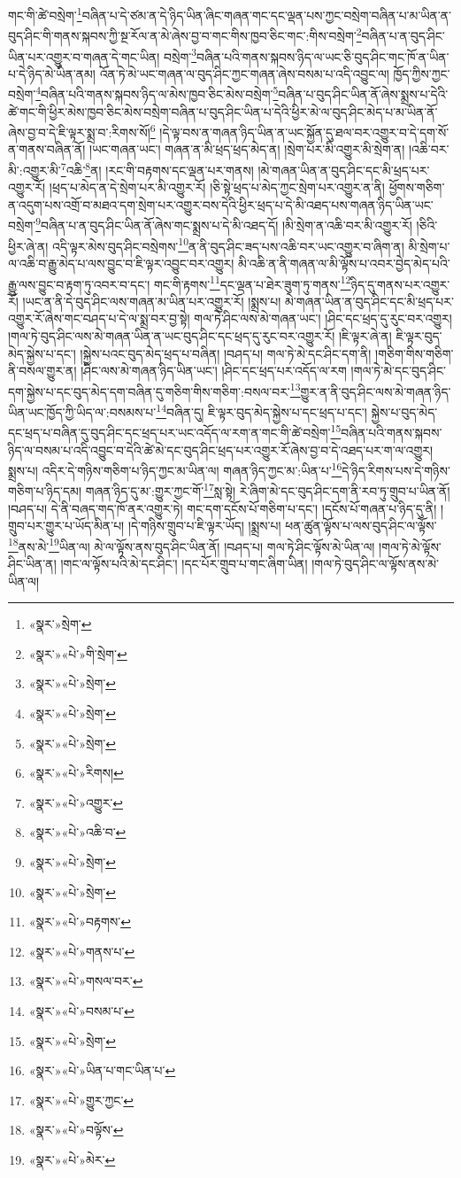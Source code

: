 གང་གི་ཚེ་བསྲེག་\footnote{«སྣར་»སྲེག་}བཞིན་པ་དེ་ཙམ་ན་དེ་ཉིད་ཡིན་ཞིང་གཞན་གང་དང་ལྡན་པས་ཀྱང་བསྲེག་བཞིན་པ་མ་ཡིན་ན་བུད་ཤིང་གི་གནས་སྐབས་ཀྱི་སྔ་རོལ་ན་མེ་ཞེས་བྱ་བ་གང་གིས་ཁྱབ་ཅིང་གང་:གིས་བསྲེག་\footnote{«སྣར་»«པེ་»གི་སྲེག་}བཞིན་པ་ན་བུད་ཤིང་ཡིན་པར་འགྱུར་བ་གཞན་དེ་གང་ཡིན། བསྲེག་\footnote{«སྣར་»«པེ་»སྲེག་}བཞིན་པའི་གནས་སྐབས་ཉིད་ལ་ཡང་ཅི་བུད་ཤིང་གང་ཁོ་ན་ཡིན་པ་དེ་ཉིད་མེ་ཡིན་ནམ། འོན་ཏེ་མེ་ཡང་གཞན་ལ་བུད་ཤིང་ཀྱང་གཞན་ཞེས་བསམ་པ་འདི་འབྱུང་ལ། ཁྱོད་ཀྱིས་ཀྱང་བསྲེག་\footnote{«སྣར་»«པེ་»སྲེག་}བཞིན་པའི་གནས་སྐབས་ཉིད་ལ་མེས་ཁྱབ་ཅིང་མེས་བསྲེག་\footnote{«སྣར་»«པེ་»སྲེག་}བཞིན་པ་བུད་ཤིང་ཡིན་ནོ་ཞེས་སྨྲས་པ་དེའི་ཚེ་གང་གི་ཕྱིར་མེས་ཁྱབ་ཅིང་མེས་བསྲེག་བཞིན་པ་བུད་ཤིང་ཡིན་པ་དེའི་ཕྱིར་མེ་ལ་བུད་ཤིང་མེད་པ་མ་ཡིན་ནོ་ཞེས་བྱ་བ་དེ་ཇི་ལྟར་སྨྲ་བ་:རིགས་སོ།\footnote{«སྣར་»«པེ་»རིགས།} །དེ་ལྟ་བས་ན་གཞན་ཉིད་ཡིན་ན་ཡང་སྐྱོན་དུ་ཐལ་བར་འགྱུར་བ་དེ་དག་སོ་ན་གནས་བཞིན་ནོ། །ཡང་གཞན་ཡང་། གཞན་ན་མི་ཕྲད་ཕྲད་མེད་ན། །སྲེག་པར་མི་འགྱུར་མི་སྲེག་ན། །འཆི་བར་མི་:འགྱུར་མི་\footnote{«སྣར་»«པེ་»འགྱུར་}འཆི་\footnote{«སྣར་»«པེ་»འཆི་བ་}ན། །རང་གི་བརྟགས་དང་ལྡན་པར་གནས། །མེ་གཞན་ཡིན་ན་བུད་ཤིང་དང་མི་ཕྲད་པར་འགྱུར་རོ། །ཕྲད་པ་མེད་ན་དེ་སྲེག་པར་མི་འགྱུར་རོ། །ཅི་སྟེ་ཕྲད་པ་མེད་ཀྱང་སྲེག་པར་འགྱུར་ན་ནི། ཕྱོགས་གཅིག་ན་འདུག་པས་འགྲོ་བ་མཐའ་དག་སྲེག་པར་འགྱུར་བས་དེའི་ཕྱིར་ཕྲད་པ་དེ་མི་འཐད་པས་གཞན་ཉིད་ཡིན་ཡང་བསྲེག་\footnote{«སྣར་»«པེ་»སྲེག་}བཞིན་པ་ན་བུད་ཤིང་ཡིན་ནོ་ཞེས་གང་སྨྲས་པ་དེ་མི་འཐད་དོ། །མི་སྲེག་ན་འཆི་བར་མི་འགྱུར་རོ། །ཅིའི་ཕྱིར་ཞེ་ན། འདི་ལྟར་མེས་བུད་ཤིང་བསྲེགས་\footnote{«སྣར་»«པེ་»སྲེག་}ན་ནི་བུད་ཤིང་ཟད་པས་འཆི་བར་ཡང་འགྱུར་བ་ཞིག་ན། མི་སྲེག་པ་ལ་འཆི་བ་རྒྱུ་མེད་པ་ལས་བྱུང་བ་ཇི་ལྟར་འབྱུང་བར་འགྱུར། མི་འཆི་ན་ནི་གཞན་ལ་མི་ལྟོས་པ་འབར་བྱེད་མེད་པའི་རྒྱུ་ལས་བྱུང་བ་རྟག་ཏུ་འབར་བ་དང་། གང་གི་རྟགས་\footnote{«སྣར་»«པེ་»བརྟགས་}དང་ལྡན་པ་ཐེར་ཟུག་ཏུ་གནས་\footnote{«སྣར་»«པེ་»གནས་པ་}ཉིད་དུ་གནས་པར་འགྱུར་རོ། །ཡང་ན་ནི་དེ་བུད་ཤིང་ལས་གཞན་མ་ཡིན་པར་འགྱུར་རོ། །སྨྲས་པ། མེ་གཞན་ཡིན་ན་བུད་ཤིང་དང་མི་ཕྲད་པར་འགྱུར་རོ་ཞེས་གང་བཤད་པ་དེ་ལ་སྨྲ་བར་བྱ་སྟེ། གལ་ཏེ་ཤིང་ལས་མེ་གཞན་ཡང་། །ཤིང་དང་ཕྲད་དུ་རུང་བར་འགྱུར། །གལ་ཏེ་བུད་ཤིང་ལས་མེ་གཞན་ཡིན་ན་ཡང་བུད་ཤིང་དང་ཕྲད་དུ་རུང་བར་འགྱུར་རོ། །ཇི་ལྟར་ཞེ་ན། ཇི་ལྟར་བུད་མེད་སྐྱེས་པ་དང་། །སྐྱེས་པའང་བུད་མེད་ཕྲད་པ་བཞིན། །བཤད་པ། གལ་ཏེ་མེ་དང་ཤིང་དག་ནི། །གཅིག་གིས་གཅིག་ནི་བསལ་གྱུར་ན། །ཤིང་ལས་མེ་གཞན་ཉིད་ཡིན་ཡང་། །ཤིང་དང་ཕྲད་པར་འདོད་ལ་རག །གལ་ཏེ་མེ་དང་བུད་ཤིང་དག་སྐྱེས་པ་དང་བུད་མེད་དག་བཞིན་དུ་གཅིག་གིས་གཅིག་:བསལ་བར་\footnote{«སྣར་»«པེ་»གསལ་བར་}གྱུར་ན་ནི་བུད་ཤིང་ལས་མེ་གཞན་ཉིད་ཡིན་ཡང་ཁྱོད་ཀྱི་ཡིད་ལ་:བསམས་པ་\footnote{«སྣར་»«པེ་»བསམ་པ་}བཞིན་དུ། ཇི་ལྟར་བུད་མེད་སྐྱེས་པ་དང་ཕྲད་པ་དང་། སྐྱེས་པ་བུད་མེད་དང་ཕྲད་པ་བཞིན་དུ་བུད་ཤིང་དང་ཕྲད་པར་ཡང་འདོད་ལ་རག་ན་གང་གི་ཚེ་བསྲེག་\footnote{«སྣར་»«པེ་»སྲེག་}བཞིན་པའི་གནས་སྐབས་ཉིད་ལ་བསམ་པ་འདི་འབྱུང་བ་དེའི་ཚེ་མེ་དང་བུད་ཤིང་ཕྲད་པར་འགྱུར་རོ་ཞེས་བྱ་བ་དེ་འཐད་པར་ག་ལ་འགྱུར། སྨྲས་པ། འདིར་དེ་གཉིས་གཅིག་པ་ཉིད་ཀྱང་མ་ཡིན་ལ། གཞན་ཉིད་ཀྱང་མ་:ཡིན་པ་\footnote{«སྣར་»«པེ་»ཡིན་པ་གང་ཡིན་པ་}དེ་ཉིད་རིགས་པས་དེ་གཉིས་གཅིག་པ་ཉིད་དམ། གཞན་ཉིད་དུ་མ་:གྱུར་ཀྱང་གོ་\footnote{«སྣར་»«པེ་»གྱུར་ཀྱང་}སླ་སྟེ། རེ་ཞིག་མེ་དང་བུད་ཤིང་དག་ནི་རབ་ཏུ་གྲུབ་པ་ཡིན་ནོ། །བཤད་པ། དེ་ནི་བཞད་གད་ཁོ་ནར་འགྱུར་ཏེ། གང་དག་དངོས་པོ་གཅིག་པ་དང་། །དངོས་པོ་གཞན་པ་ཉིད་དུ་ནི། །གྲུབ་པར་གྱུར་པ་ཡོད་མིན་པ། །དེ་གཉིས་གྲུབ་པ་ཇི་ལྟར་ཡོད། །སྨྲས་པ། ཕན་ཚུན་ལྟོས་པ་ལས་བུད་ཤིང་ལ་ལྟོས་\footnote{«སྣར་»«པེ་»བལྟོས་}ནས་མེ་\footnote{«སྣར་»«པེ་»མེར་}ཡིན་ལ། མེ་ལ་ལྟོས་ནས་བུད་ཤིང་ཡིན་ནོ། །བཤད་པ། གལ་ཏེ་ཤིང་ལྟོས་མེ་ཡིན་ལ། །གལ་ཏེ་མེ་ལྟོས་ཤིང་ཡིན་ན། །གང་ལ་ལྟོས་པའི་མེ་དང་ཤིང་། །དང་པོར་གྲུབ་པ་གང་ཞིག་ཡིན། །གལ་ཏེ་བུད་ཤིང་ལ་ལྟོས་ནས་མེ་ཡིན་ལ། 